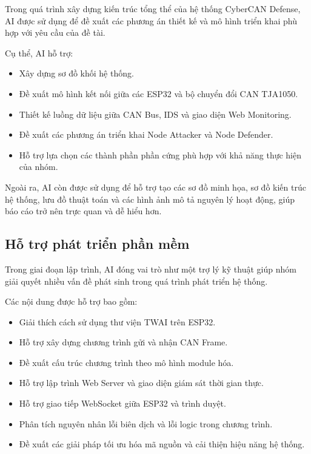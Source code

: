 Trong quá trình xây dựng kiến trúc tổng thể của hệ thống CyberCAN Defense, AI được sử dụng để đề xuất các phương án thiết kế và mô hình triển khai phù hợp với yêu cầu của đề tài.

Cụ thể, AI hỗ trợ:

\begin{itemize}
	\item Xây dựng sơ đồ khối hệ thống.
	\item Đề xuất mô hình kết nối giữa các ESP32 và bộ chuyển đổi CAN TJA1050.
	\item Thiết kế luồng dữ liệu giữa CAN Bus, IDS và giao diện Web Monitoring.
	\item Đề xuất các phương án triển khai Node Attacker và Node Defender.
	\item Hỗ trợ lựa chọn các thành phần phần cứng phù hợp với khả năng thực hiện của nhóm.
\end{itemize}

Ngoài ra, AI còn được sử dụng để hỗ trợ tạo các sơ đồ minh họa, sơ đồ kiến trúc hệ thống, lưu đồ thuật toán và các hình ảnh mô tả nguyên lý hoạt động, giúp báo cáo trở nên trực quan và dễ hiểu hơn.

\subsection{Hỗ trợ phát triển phần mềm}

Trong giai đoạn lập trình, AI đóng vai trò như một trợ lý kỹ thuật giúp nhóm giải quyết nhiều vấn đề phát sinh trong quá trình phát triển hệ thống.

Các nội dung được hỗ trợ bao gồm:

\begin{itemize}
	\item Giải thích cách sử dụng thư viện TWAI trên ESP32.
	\item Hỗ trợ xây dựng chương trình gửi và nhận CAN Frame.
	\item Đề xuất cấu trúc chương trình theo mô hình module hóa.
	\item Hỗ trợ lập trình Web Server và giao diện giám sát thời gian thực.
	\item Hỗ trợ giao tiếp WebSocket giữa ESP32 và trình duyệt.
	\item Phân tích nguyên nhân lỗi biên dịch và lỗi logic trong chương trình.
	\item Đề xuất các giải pháp tối ưu hóa mã nguồn và cải thiện hiệu năng hệ thống.
\end{itemize}

